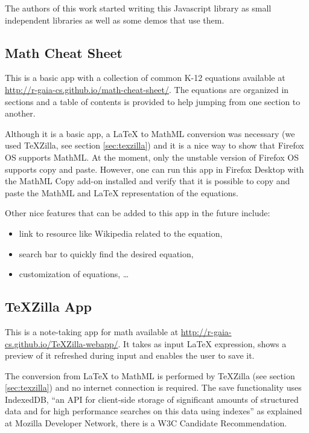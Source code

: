 The authors of this work started writing this Javascript library as small
independent libraries as well as some demos that use them.

\subsection{Math Cheat Sheet}

This is a basic app with a collection of common K-12 equations available at
\href{http://r-gaia-cs.github.io/math-cheat-sheet/}{http://r-gaia-cs.github.io/math-cheat-sheet/}.
The equations are organized in sections and a table of contents is provided to
help jumping from one section to another.

Although it is a basic app, a LaTeX to MathML conversion was necessary
(we used TeXZilla, see section \ref{sec:texzilla})
 and it is a nice way to show that Firefox OS supports
MathML. At the moment, only the unstable version of Firefox OS supports copy
and paste. However, one can run this app in Firefox Desktop with the MathML Copy
add-on installed and verify that it is possible to
copy and paste the MathML and LaTeX representation of the equations.

Other nice features that can be added to this app in the future include:
\begin{itemize}
  \item link to resource like Wikipedia related to the equation,
  \item search bar to quickly find the desired equation,
  \item customization of equations, \ldots
\end{itemize}

\subsection{TeXZilla App}
\label{sec:texzillapp}

This is a note-taking app for math available at
\href{http://r-gaia-cs.github.io/TeXZilla-webapp/}{http://r-gaia-cs.github.io/TeXZilla-webapp/}.
It takes as input LaTeX expression, shows a preview of it refreshed during
input and enables the user to save it.

The conversion from LaTeX to MathML is performed by TeXZilla
(see section \ref{sec:texzilla})
and no internet connection is required. The save functionality
uses IndexedDB, ``an API for client-side storage of significant amounts of
structured data and for high performance searches on this data using indexes''
as explained at Mozilla Developer Network, there is a W3C Candidate
Recommendation.

